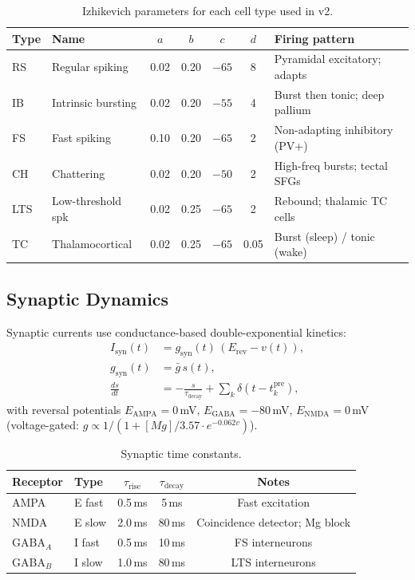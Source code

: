 \documentclass[11pt,a4paper]{article}
\begin{document}
\begin{table}[H]
\centering
\caption{Izhikevich parameters for each cell type used in v2.}
\label{tab:izhi_params}
\begin{tabular}{llccccp{4cm}}
\toprule
Type & Name & $a$ & $b$ & $c$ & $d$ & Firing pattern \\
\midrule
RS  & Regular spiking    & 0.02 & 0.20 & $-65$ &  8 & Pyramidal excitatory; adapts \\
IB  & Intrinsic bursting & 0.02 & 0.20 & $-55$ &  4 & Burst then tonic; deep pallium \\
FS  & Fast spiking       & 0.10 & 0.20 & $-65$ &  2 & Non-adapting inhibitory (PV+) \\
CH  & Chattering         & 0.02 & 0.20 & $-50$ &  2 & High-freq bursts; tectal SFGs \\
LTS & Low-threshold spk  & 0.02 & 0.25 & $-65$ &  2 & Rebound; thalamic TC cells \\
TC  & Thalamocortical    & 0.02 & 0.25 & $-65$ &  0.05 & Burst (sleep) / tonic (wake) \\
\bottomrule
\end{tabular}
\end{table}

\subsection{Synaptic Dynamics}

Synaptic currents use conductance-based double-exponential kinetics:
\begin{equation}\label{eq:synapse}
\begin{aligned}
  I_\text{syn}(t) &= g_\text{syn}(t)\,(E_\text{rev} - v(t)), \\
  g_\text{syn}(t) &= \bar{g}\,s(t), \\
  \frac{ds}{dt}   &= -\frac{s}{\tau_\text{decay}} + \sum_k \delta(t - t_k^\text{pre}),
\end{aligned}
\end{equation}
with reversal potentials $E_\text{AMPA} = 0$\,mV, $E_\text{GABA} = -80$\,mV,
$E_\text{NMDA} = 0$\,mV (voltage-gated: $g \propto 1/(1+[Mg]/3.57 \cdot e^{-0.062v})$).

\begin{table}[H]
\centering
\caption{Synaptic time constants.}
\label{tab:syn_tau}
\begin{tabular}{llccc}
\toprule
Receptor & Type & $\tau_\text{rise}$ & $\tau_\text{decay}$ & Notes \\
\midrule
AMPA  & E fast   & 0.5\,ms &  5\,ms & Fast excitation \\
NMDA  & E slow   & 2.0\,ms & 80\,ms & Coincidence detector; Mg block \\
GABA$_A$ & I fast & 0.5\,ms & 10\,ms & FS interneurons \\
GABA$_B$ & I slow & 1.0\,ms & 80\,ms & LTS interneurons \\
\bottomrule
\end{tabular}
\end{table}
\end{document}
